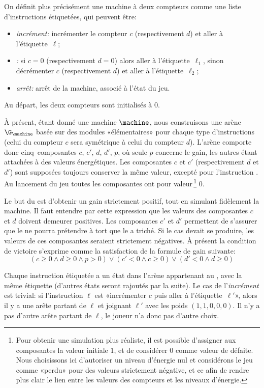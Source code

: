 On définit plus précisément une machine à deux compteurs comme une liste d'instructions étiquetées, qui peuvent être:
\begin{itemize}
    \item \textit{incrément:} incrémenter le compteur $c$ (respectivement $d$) et aller à l'étiquette~$\ell$;
    \item \textit{\tjztest:} si $c=0$ (respectivement $d=0$) alors aller à l'étiquette~$\ell_1$, sinon décrémenter $c$ (respectivement $d$) et aller à l'étiquette~$\ell_2$;
    \item \textit{arrêt:} arrêt de la machine, associé à l'état \tjhalt du jeu.
\end{itemize}
Au départ, les deux compteurs sont initialisés à $0$.

À présent, étant donné une machine $\machine$, nous construisons une arène $\G_\machine$ basée sur des modules «élémentaires» pour chaque type d'instructions (celui du compteur $c$ sera symétrique à celui du compteur $d$).
L'arène comporte donc cinq~composantes $c$, $c'$, $d$, $d'$, $p$, où seule $p$ concerne le gain, les autres étant attachées à des valeurs énergétiques.
Les composantes $c$ et $c'$ (respectivement $d$ et $d'$) sont supposées toujours conserver la même valeur, excepté pour l'instruction \tjztest.
Au lancement du jeu toutes les composantes ont pour valeur\,\footnote{Pour obtenir une simulation plus réaliste, il est possible d'assigner aux composantes la valeur initiale $1$, et de considérer $0$ comme valeur de défaite. Nous choisissons ici d'autoriser un niveau d'énergie nul et considérons le jeu comme «perdu» pour des valeurs strictement négative, et ce afin de rendre plus clair le lien entre les valeurs des compteurs et les niveaux d'énergie.} $0$.

Le but du \jo est d'obtenir un gain strictement positif, tout en simulant fidèlement la machine.
Il faut entendre par cette expression que les valeurs des composantes $c$ et $d$ doivent demeurer positives.
Les composantes $c'$ et $d'$ permettent de s'assurer que le \ji ne pourra prétendre à tort que le \jo a triché.
Si le cas devait se produire, les valeurs de ces composantes seraient strictement négatives.
À présent la condition de victoire s'exprime comme la satisfaction de la formule de gain suivante:
\[(c\geq0 \wedge d\geq0 \wedge p>0) \vee (c'<0 \wedge c\geq0) \vee (d'<0 \wedge d\geq0)\]

Chaque instruction étiquetée a un état dans l'arène appartenant au \jo, avec la même étiquette (d'autres états seront rajoutés par la suite).
Le cas de l'\textit{incrément} est trivial: si l'instruction $\ell$ est «incrémenter $c$ puis aller à l'étiquette~$\ell'$», alors il y a une arête partant de $\ell$ et joignant $\ell'$ avec les poids $(1,1,0,0,0)$.
Il n'y a pas d'autre arête partant de $\ell$, le joueur n'a donc pas d'autre choix.

